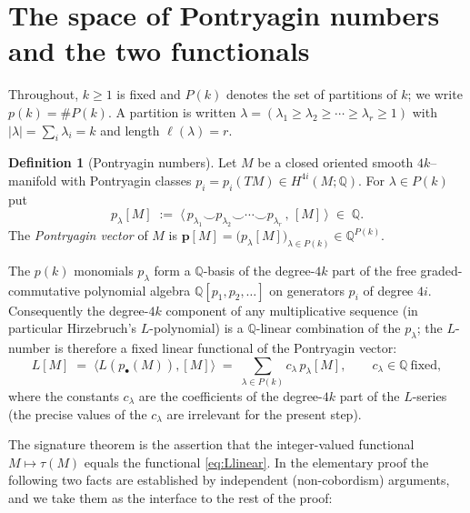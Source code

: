 \documentclass[12pt]{article}
\theoremstyle{definition}
\newtheorem{definition}{Definition}
\begin{document}
\bigskip

\section{The space of Pontryagin numbers and the two functionals}

Throughout, $k\ge 1$ is fixed and $P(k)$ denotes the set of partitions of $k$; we write
$p(k)=\#P(k)$.  A partition is written $\lambda=(\lambda_1\ge\lambda_2\ge\cdots\ge
\lambda_r\ge 1)$ with $|\lambda|=\sum_i\lambda_i=k$ and length $\ell(\lambda)=r$.

\begin{definition}[Pontryagin numbers]\label{def:pn}
Let $M$ be a closed oriented smooth $4k$--manifold with Pontryagin classes
$p_i=p_i(TM)\in H^{4i}(M;\mathbb{Q})$.  For $\lambda\in P(k)$ put
\[
p_\lambda[M]\;:=\;\big\langle\, p_{\lambda_1}\smile p_{\lambda_2}\smile\cdots\smile
p_{\lambda_r}\,,\,[M]\,\big\rangle\;\in\;\mathbb{Q}.
\]
The \emph{Pontryagin vector} of $M$ is
$\mathbf{p}[M]=\big(p_\lambda[M]\big)_{\lambda\in P(k)}\in\mathbb{Q}^{P(k)}$.
\end{definition}

The $p(k)$ monomials $p_\lambda$ form a $\mathbb{Q}$-basis of the degree-$4k$ part of
the free graded-commutative polynomial algebra $\mathbb{Q}[p_1,p_2,\dots]$ on generators
$p_i$ of degree $4i$.  Consequently the degree-$4k$ component of any multiplicative
sequence (in particular Hirzebruch's $L$-polynomial) is a $\mathbb{Q}$-linear
combination of the $p_\lambda$; the $L$-number is therefore a fixed linear functional of
the Pontryagin vector:
\[
L[M]\;=\;\big\langle L(p_\bullet(M)),[M]\big\rangle\;=\;
\sum_{\lambda\in P(k)} c_\lambda\, p_\lambda[M],
\qquad c_\lambda\in\mathbb{Q}\ \text{fixed},
\tag{1}\label{eq:Llinear}
\]
where the constants $c_\lambda$ are the coefficients of the degree-$4k$ part of the
$L$-series (the precise values of the $c_\lambda$ are irrelevant for the present step).

The signature theorem is the assertion that the integer-valued functional $M\mapsto
\tau(M)$ equals the functional \eqref{eq:Llinear}.  In the elementary proof the
following two facts are established by independent (non-cobordism) arguments, and we take
them as the interface to the rest of the proof:
\end{document}
